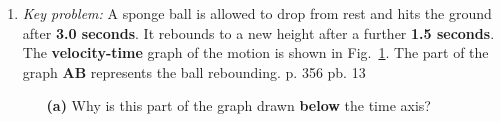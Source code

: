 \documentclass[A4,12pt]{article}
\begin{document}
\begin{enumerate}[label=\bfseries (\arabic*)]
\begin{itemize}
\end{itemize}




































\item {\it Key problem:} A sponge ball is allowed to drop from rest and hits the ground after \textbf{3.0 seconds}. It rebounds to a new height after a further \textbf{1.5 seconds}. The \textbf{velocity-time} graph of the motion is shown in Fig.~\ref{hijolino}.
The part of the graph \textbf{AB} represents the ball rebounding. \cite{CCEADA} p. 356 pb. 13
%
%
\begin{figure}[H]
    \centering
\caption{}
\label{hijolino}
\end{figure}
%
%
%
\begin{itemize}
    \item[\bf (a)] Why is this part of the graph drawn \textbf{below} the time axis? 

\end{itemize}
\end{enumerate}
\end{document}
